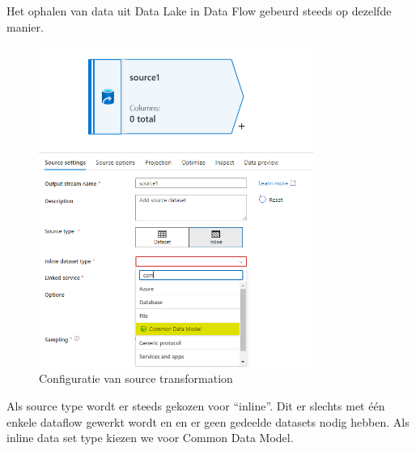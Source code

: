 Het ophalen van data uit Data Lake in Data Flow gebeurd steeds op dezelfde manier. 

\begin{figure}[H]
    \centering
    \includegraphics[width=0.8\textwidth]{./graphics/adf/source_table_1_specific.png}
    \caption{Configuratie van source transformation}
\end{figure}

Als source type wordt er steeds gekozen voor ``inline''. Dit er slechts met één enkele dataflow gewerkt wordt en en er geen gedeelde datasets nodig hebben. Als inline data set type kiezen we voor Common Data Model.

